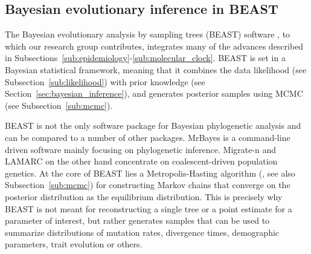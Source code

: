 
\subsection{Bayesian evolutionary inference in BEAST}

The Bayesian evolutionary analysis by sampling trees (BEAST) software \citep{Drummond2012}, to which our research group contributes, integrates many of the advances described in Subsections~\ref{sub:epidemiology}-\ref{sub:molecular_clock}.
BEAST is set in a Bayesian statistical framework, meaning that it combines the data likelihood (see Subsection~\ref{sub:likelihood}) with prior knowledge (see Section~\ref{sec:bayesian_inference}), and generates posterior samples using MCMC (see Subsection~\ref{sub:mcmc}).

BEAST is not the only software package for Bayesian phylogenetic analysis and can be compared to a number of other packages.
MrBayes \citep{Huelsenbeck2001} is a command-line driven software mainly focusing on phylogenetic inference.
Migrate-n \citep{migrate} and LAMARC \citep{Kuhner2006} on the other hand concentrate on coalescent-driven population genetics.
At the core of BEAST lies a Metropolis-Hasting algorithm (\cite{Metropolis1953, Hasting1970}, see also Subsection~\ref{sub:mcmc}) for constructing Markov chains that converge on the posterior distribution as the equilibrium distribution.
This is precisely why BEAST is not meant for reconstructing a single tree or a point estimate for a parameter of interest, but rather generates samples that can be used to summarize distributions of mutation rates, divergence times, demographic parameters, trait evolution or others.

